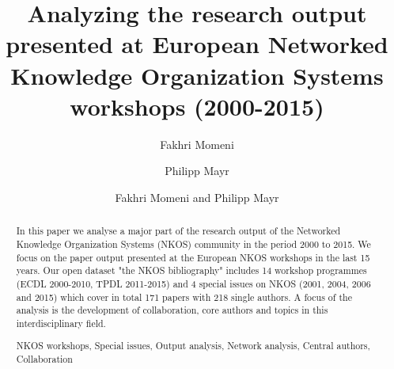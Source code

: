 \documentclass[runningheads,a4paper]{llncs}
\newcommand{\keywords}[1]{\par\addvspace\baselineskip
\noindent\keywordname\enspace\ignorespaces#1}
\begin{document}
\mainmatter  %

\title{Analyzing the research output presented at European Networked Knowledge Organization Systems workshops (2000-2015)}



%
%
\author{Fakhri Momeni%
	\and Philipp Mayr}
%

\author{Fakhri Momeni and Philipp Mayr}

%
%

\maketitle


\begin{abstract}		
In this paper we analyse a major part of the research output of the Networked Knowledge Organization Systems (NKOS) community in the period 2000 to 2015. We focus on the paper output presented at the European NKOS workshops in the last 15 years. Our open dataset "the NKOS bibliography" includes 14 workshop programmes (ECDL 2000-2010, TPDL 2011-2015) and 4 special  issues on NKOS (2001, 2004, 2006 and 2015) which cover in total 171 %
papers with 218 %
single authors. A focus of the analysis is the development of collaboration, core authors and topics in this interdisciplinary field. %

 
\keywords{NKOS workshops, Special issues, Output analysis, Network analysis, Central authors, Collaboration}
\end{abstract}
\end{document}

